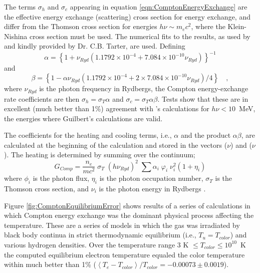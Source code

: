 The terms $\sigma_h$ and $\sigma_c$ appearing in equation \ref{eqn:ComptonEnergyExchange} are the effective energy
exchange (scattering) cross section for energy exchange, and differ from
the Thomson cross section for energies $h\nu\sim m_e c^2$, where the Klein-Nishina
cross section must be used.
The numerical fits to the \citep{Winslow1975} results,
as used by \citep{Krolik1981} and kindly provided by Dr. C.B.
Tarter, are used.  Defining
\begin{equation}
\alpha  = {\left\{ {1 + {\nu _{Ryd}}\left( {1.1792 \times {{10}^{ - 4}}
+ 7.084 \times {{10}^{ - 10}}{\nu _{Ryd}}} \right)} \right\}^{ - 1}}
\end{equation}
and
\begin{equation}
\beta  = \left\{ {1 - \alpha {\nu _{Ryd}}\left( {1.1792 \times {{10}^{
- 4}} + 2 \times 7.084 \times {{10}^{ - 10}}{\nu _{Ryd}}} \right)/4}
\right\}\quad ,
\end{equation}
where $\nu_{Ryd}$ is the photon frequency in Rydbergs, the Compton energy-exchange
rate coefficients are then $\sigma_h = \sigma_T\alpha$  and $\sigma_c =
\sigma_T\alpha\beta$.
Tests show that these are
in excellent  (much better than 1\%) agreement with \citep{Guilbert1986}'s calculations for $h\nu < 10$~MeV,
the energies where Guilbert's calculations are valid.

The coefficients for the heating and cooling terms, i.e., $\alpha$ and the product
$\alpha\beta$, are calculated at the beginning of the calculation and stored in the
vectors ($\nu$) and ($\nu$).  The heating is determined by summing over
the continuum;
\begin{equation}
{G_{Comp}} = \frac{{{n_e}}}{{m{c^2}}}\;{\sigma _T}\;{\left( {h{\nu _{Ryd}}}
\right)^2}\;\sum {{\alpha _i}\;{\varphi _i}\;\nu _i^2\left( {1 + {\eta _i}}
\right)}
\end{equation}
where $\phi_i$ is the photon flux, $\eta_i$ is the photon occupation
number, $\sigma_T$ is the
Thomson cross section, and $\nu_i$ is the photon energy in Rydbergs .

Figure \ref{fig:ComptonEquilibriumError} shows results of a series of calculations in which Compton energy
exchange was the dominant physical process affecting the temperature.  These
are a series of models in which the gas was irradiated by black body continua
in strict thermodynamic equilibrium (i.e., $T_u = T_{color}$) and various hydrogen
densities.
Over the temperature range 3 K $\le T_{color}\le 10^{10}$~K the computed
equilibrium electron temperature equaled the color temperature within much
better than 1\% ($\left\langle {{T_e} - {T_{color}}} \right\rangle
/{T_{color}} =  - 0.00073 \pm 0.0019$).

